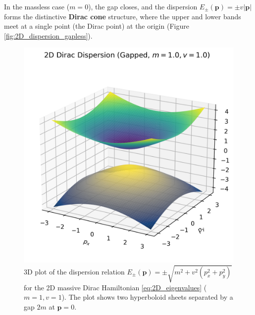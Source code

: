 \documentclass[11pt]{article}
\begin{document}
In the massless case ($m=0$), the gap closes, and the dispersion $E_{\pm}(\mathbf{p}) = \pm v |\mathbf{p}|$ forms the distinctive \textbf{Dirac cone} structure, where the upper and lower bands meet at a single point (the Dirac point) at the origin (Figure \ref{fig:2D_dispersion_gapless}).
\begin{figure}[htbp]
  \centering
  \begin{minipage}[t]{0.48\textwidth}
    \centering
    \includegraphics[width=\textwidth]{2d_dirac_dispersion_gapped.png}
    \caption{3D plot of the dispersion relation $E_{\pm}(\mathbf{p}) = \pm \sqrt{m^2 + v^2(p_x^2+p_y^2)}$ for the 2D massive Dirac Hamiltonian \eqref{eq:2D_eigenvalues} ($m=1, v=1$). The plot shows two hyperboloid sheets separated by a gap $2m$ at $\mathbf{p}=0$.}
    \label{fig:2D_dispersion_gapped}
  \end{minipage}
  \hfill
  \begin{minipage}[t]{0.48\textwidth}
    \centering

\end{minipage}
\end{figure}
\end{document}
